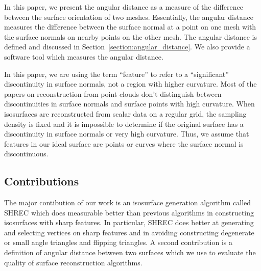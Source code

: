 In this paper, we present the angular distance as a measure
of the difference between the surface orientation of two meshes.
Essentially, the angular distance measures the difference 
between the surface normal at a point on one mesh with the surface normals
on nearby points on the other mesh.
The angular distance is defined and discussed
in Section~\ref{section:angular_distance}.
We also provide a software tool which measures the angular distance.

In this paper, we are using the term ``feature'' to refer 
to a ``significant'' discontinuity in surface normals,
not a region with higher curvature.
Most of the papers on reconstruction from point clouds
don't distinguish between discontinuities in surface normals
and surface points with high curvature.
When isosurfaces are reconstructed from scalar data on a regular grid,
the sampling density is fixed and
it is impossible to determine if the original surface has
a discontinuity in surface normals or very high curvature.
Thus, we assume that features in our ideal surface are
points or curves where the surface normal is discontinuous.


\subsection*{Contributions}

The major contibution of our work is an isosurface generation algorithm
called SHREC which does measurable better than previous algorithms
in constructing isosurfaces with sharp features.
In particular, SHREC does better at generating and selecting vertices 
on sharp features and in avoiding constructing degenerate 
or small angle triangles and flipping triangles.
A second contribution is a definition of angular distance 
between two surfaces which we use to evaluate the quality 
of surface reconstruction algorithms.
